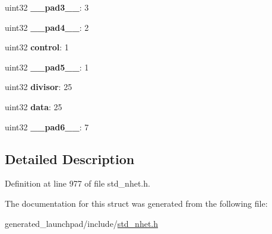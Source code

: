 \begin{DoxyCompactItemize}
\mbox{\label{structrcnt__format_af15d2c26b4e924dcf13724aea31ea54c}} 
uint32 {\bfseries \+\_\+\+\_\+pad3\+\_\+\+\_\+}\+: 3
\item 
\mbox{\label{structrcnt__format_a5b98ac0bdb5c3509ab906aed38e40ba1}} 
uint32 {\bfseries \+\_\+\+\_\+pad4\+\_\+\+\_\+}\+: 2
\item 
\mbox{\label{structrcnt__format_a6330c90143bfe39ef34dc582aa604d3e}} 
uint32 {\bfseries control}\+: 1
\item 
\mbox{\label{structrcnt__format_a326825e907faaa6219cc9a23ebdeeca8}} 
uint32 {\bfseries \+\_\+\+\_\+pad5\+\_\+\+\_\+}\+: 1
\item 
\mbox{\label{structrcnt__format_afa2eb2f03a38b277c7381af5e37926eb}} 
uint32 {\bfseries divisor}\+: 25
\item 
\mbox{\label{structrcnt__format_adeefcea32c2cfdbdca2b121b0e719d6b}} 
uint32 {\bfseries data}\+: 25
\item 
\mbox{\label{structrcnt__format_ac300c37c9b3f684f12a1d15e82f7cfe8}} 
uint32 {\bfseries \+\_\+\+\_\+pad6\+\_\+\+\_\+}\+: 7
\end{DoxyCompactItemize}


\subsection{Detailed Description}


Definition at line 977 of file std\+\_\+nhet.\+h.



The documentation for this struct was generated from the following file\+:\begin{DoxyCompactItemize}
\item 
generated\+\_\+launchpad/include/\mbox{\hyperlink{std__nhet_8h}{std\+\_\+nhet.\+h}}\end{DoxyCompactItemize}
